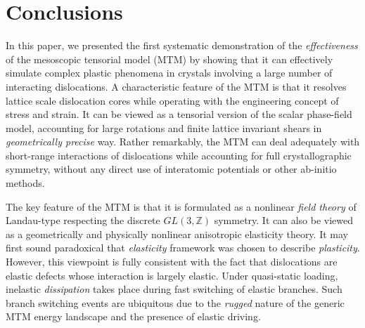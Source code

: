 \documentclass[CRPHYS,Unicode,manuscript]{cedram}
\begin{document}


 
\section{Conclusions}

In this paper, we presented the first systematic demonstration of the \emph{effectiveness} of the mesoscopic tensorial model (MTM)  by showing that it can effectively simulate complex plastic phenomena in crystals involving a large number of interacting dislocations. A characteristic feature of the MTM is that it resolves lattice scale dislocation cores while operating with the engineering concept of stress and strain. It can be viewed as a tensorial version of the scalar phase-field model, accounting for large rotations and finite lattice invariant shears in \emph{geometrically precise} way. Rather remarkably, the MTM can deal adequately with short-range interactions of dislocations while accounting for full crystallographic symmetry, without any direct use of interatomic potentials or other ab-initio methods. 

The key feature of the MTM is that it is formulated as a nonlinear \emph{field theory} of Landau-type respecting the discrete $GL(3,\mathbb Z)$ symmetry. It can also be viewed as a geometrically and physically nonlinear anisotropic elasticity theory.  It may first sound paradoxical that  \emph{elasticity} framework was chosen to describe \emph{plasticity}. However, this viewpoint is fully consistent with the fact that dislocations are elastic defects whose interaction is largely elastic. Under quasi-static loading, inelastic \emph{dissipation} takes place during fast switching of elastic branches.  Such branch switching events are ubiquitous due to the \emph{rugged} nature of the generic MTM energy landscape and the presence of elastic driving.
\end{document}
